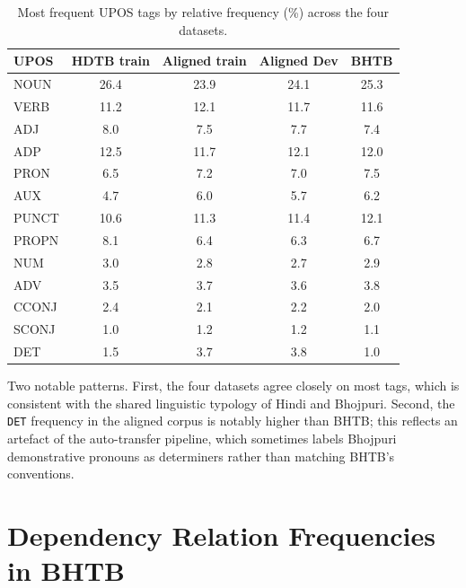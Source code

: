 \documentclass[12pt,a4paper,oneside]{report}
\begin{document}
\begin{table}[ht]
\centering
\caption{Most frequent UPOS tags by relative frequency (\%) across the four datasets.}
\label{tab:upos_freq}
\begin{tabular}{@{}lcccc@{}}
\toprule
\textbf{UPOS} & \textbf{HDTB train} & \textbf{Aligned train} & \textbf{Aligned Dev} & \textbf{BHTB} \\
\midrule
NOUN     & 26.4 & 23.9 & 24.1 & 25.3 \\
VERB     & 11.2 & 12.1 & 11.7 & 11.6 \\
ADJ      &  8.0 &  7.5 &  7.7 &  7.4 \\
ADP      & 12.5 & 11.7 & 12.1 & 12.0 \\
PRON     &  6.5 &  7.2 &  7.0 &  7.5 \\
AUX      &  4.7 &  6.0 &  5.7 &  6.2 \\
PUNCT    & 10.6 & 11.3 & 11.4 & 12.1 \\
PROPN    &  8.1 &  6.4 &  6.3 &  6.7 \\
NUM      &  3.0 &  2.8 &  2.7 &  2.9 \\
ADV      &  3.5 &  3.7 &  3.6 &  3.8 \\
CCONJ    &  2.4 &  2.1 &  2.2 &  2.0 \\
SCONJ    &  1.0 &  1.2 &  1.2 &  1.1 \\
DET      &  1.5 &  3.7 &  3.8 &  1.0 \\
\bottomrule
\end{tabular}
\end{table}

Two notable patterns. First, the four datasets agree closely on most tags,
which is consistent with the shared linguistic typology of Hindi and Bhojpuri.
Second, the \texttt{DET} frequency in the aligned corpus is notably higher
than BHTB; this reflects an artefact of the auto-transfer pipeline, which
sometimes labels Bhojpuri demonstrative pronouns as determiners rather than
matching BHTB's conventions.

\section{Dependency Relation Frequencies in BHTB}
\end{document}

